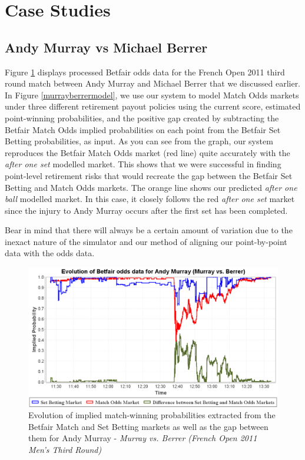 \documentclass[authoryear, 12pt]{elsarticle}
\begin{document}
\section{Case Studies}

\subsection{Andy Murray vs Michael Berrer}

Figure \ref{murrayberrer2} displays processed Betfair odds data for the French Open 2011 third round match between Andy Murray and Michael Berrer that we discussed earlier.  In Figure \ref{murrayberrermodel}, we use our system to model Match Odds markets under three different retirement payout policies using the current score, estimated point-winning probabilities, and the positive gap created by subtracting the Betfair Match Odds implied probabilities on each point from the Betfair Set Betting probabilities, as input.  As you can see from the graph, our system reproduces the Betfair Match Odds market (red line) quite accurately with the \textit{after one set} modelled market.  This shows that we were successful in finding point-level retirement risks that would recreate the gap between the Betfair Set Betting and Match Odds markets.  The orange line shows our predicted \textit{after one ball} modelled market.  In this case, it closely follows the red \textit{after one set} market since the injury to Andy Murray occurs after the first set has been completed.

Bear in mind that there will always be a certain amount of variation due to the inexact nature of the simulator and our method of aligning our point-by-point data with the odds data.

\begin{figure}[H]
  \centering \includegraphics[width=12.3cm]{murrayberrer}
  \caption{Evolution of implied match-winning probabilities extracted from the Betfair Match and Set Betting markets as well as the gap between them for Andy Murray - \textit{Murray vs. Berrer (French Open 2011 Men's Third Round)}}
  \label{murrayberrer2}
\end{figure}
\end{document}
